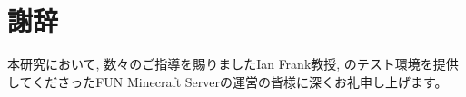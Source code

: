 \pagestyle{plain}
\chapter*{謝辞}

本研究において, 数々のご指導を賜りましたIan Frank教授, {\mason}のテスト環境を提供してくださったFUN Minecraft Serverの運営の皆様に深くお礼申し上げます。
